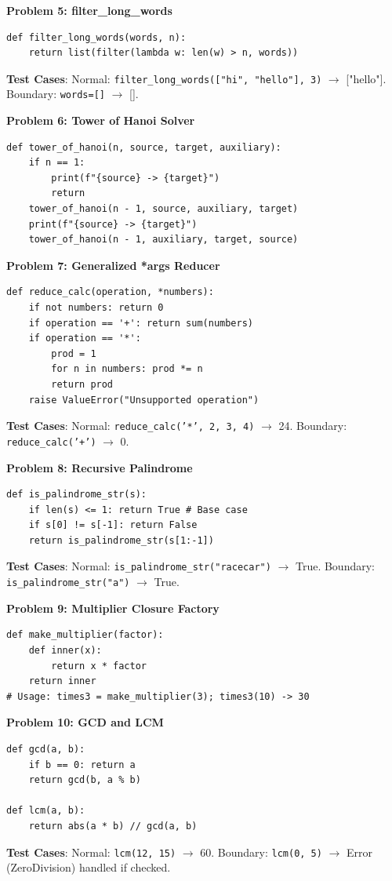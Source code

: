\begin{solutionbox}[Solutions 5-7]
\noindent\textbf{Problem 5: filter\_long\_words}
\begin{lstlisting}[language=Python3]
def filter_long_words(words, n):
    return list(filter(lambda w: len(w) > n, words))
\end{lstlisting}
\textbf{Test Cases}: Normal: \texttt{filter\_long\_words(["hi", "hello"], 3)} $\to$ ["hello"]. Boundary: \texttt{words=[]} $\to$ [].

\noindent\textbf{Problem 6: Tower of Hanoi Solver}
\begin{lstlisting}[language=Python3]
def tower_of_hanoi(n, source, target, auxiliary):
    if n == 1:
        print(f"{source} -> {target}")
        return
    tower_of_hanoi(n - 1, source, auxiliary, target)
    print(f"{source} -> {target}")
    tower_of_hanoi(n - 1, auxiliary, target, source)
\end{lstlisting}

\noindent\textbf{Problem 7: Generalized *args Reducer}
\begin{lstlisting}[language=Python3]
def reduce_calc(operation, *numbers):
    if not numbers: return 0
    if operation == '+': return sum(numbers)
    if operation == '*':
        prod = 1
        for n in numbers: prod *= n
        return prod
    raise ValueError("Unsupported operation")
\end{lstlisting}
\textbf{Test Cases}: Normal: \texttt{reduce\_calc('*', 2, 3, 4)} $\to$ 24. Boundary: \texttt{reduce\_calc('+')} $\to$ 0.
\end{solutionbox}

\begin{solutionbox}[Solutions 8-10]
\noindent\textbf{Problem 8: Recursive Palindrome}
\begin{lstlisting}[language=Python3]
def is_palindrome_str(s):
    if len(s) <= 1: return True # Base case
    if s[0] != s[-1]: return False
    return is_palindrome_str(s[1:-1])
\end{lstlisting}
\textbf{Test Cases}: Normal: \texttt{is\_palindrome\_str("racecar")} $\to$ True. Boundary: \texttt{is\_palindrome\_str("a")} $\to$ True.

\noindent\textbf{Problem 9: Multiplier Closure Factory}
\begin{lstlisting}[language=Python3]
def make_multiplier(factor):
    def inner(x):
        return x * factor
    return inner
# Usage: times3 = make_multiplier(3); times3(10) -> 30
\end{lstlisting}

\noindent\textbf{Problem 10: GCD and LCM}
\begin{lstlisting}[language=Python3]
def gcd(a, b):
    if b == 0: return a
    return gcd(b, a % b)

def lcm(a, b):
    return abs(a * b) // gcd(a, b)
\end{lstlisting}
\textbf{Test Cases}: Normal: \texttt{lcm(12, 15)} $\to$ 60. Boundary: \texttt{lcm(0, 5)} $\to$ Error (ZeroDivision) handled if checked.
\end{solutionbox}


